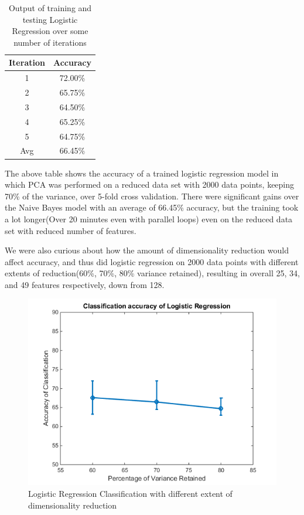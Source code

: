 \documentclass{article} %
\begin{document}
\begin{table}[h]
\centering
\begin{tabular}{|c|c|}
\hline
Iteration & Accuracy \\
\hline
1 & 72.00\% \\
2 & 65.75\% \\
3 & 64.50\% \\
4 & 65.25\% \\
5 & 64.75\% \\
\hline
Avg & 66.45\% \\ 
\hline
\end{tabular}
\caption{Output of training and testing Logistic Regression over some number of iterations}
\label{tab:mid-logr-results}
\end{table}

The above table shows the accuracy of a trained logistic regression model in which PCA was performed on a reduced data set with 2000 data points, keeping 70\% of the variance, over 5-fold cross validation. There were significant gains over the Naive Bayes model with an average of 66.45\% accuracy, but the training took a lot longer(Over 20 minutes even with parallel loops) even on the reduced data set with reduced number of features.

We were also curious about how the amount of dimensionality reduction would affect accuracy, and thus did logistic regression on 2000 data points with different extents of reduction(60\%, 70\%, 80\% variance retained), resulting in overall 25, 34, and 49 features respectively, down from 128.

\begin{figure}[h]
\begin{center}
\includegraphics[scale=0.7]{lr_acc.png}
\end{center}
\caption{Logistic Regression Classification with different extent of dimensionality reduction}
\end{figure}
\end{document}

